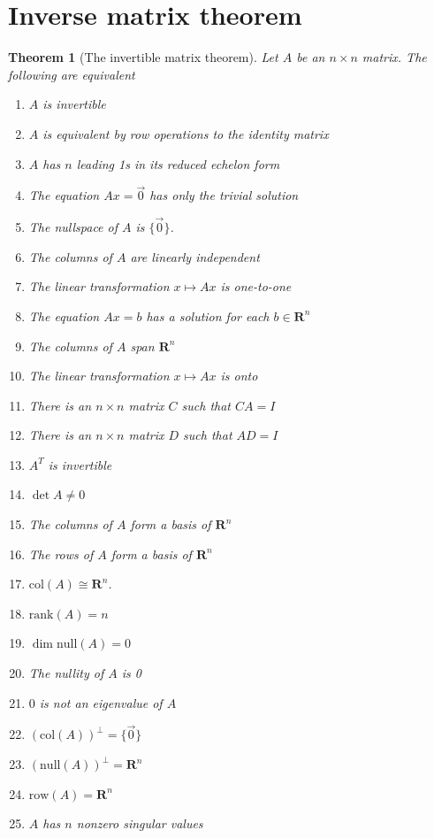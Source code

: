 \documentclass[12pt]{article}
\numberwithin{equation}{subsection}
\numberwithin{figure}{subsection}
\newtheorem{thm}[subsection]{Theorem}
\theoremstyle{note}
\newcommand{\R}{\mathbf{R}}
\newcommand\nul[1]{\mathrm{null}(#1)}
\newcommand\col[1]{\mathrm{col}(#1)}
\newcommand\row[1]{\mathrm{row}(#1)}
\newcommand\rank[1]{\mathrm{rank}(#1)}
\begin{document}
\newpage

 
\appendix



\section{Inverse matrix theorem} \label{ap-inv-mat-thm}

\begin{thm}[The invertible matrix theorem]
	Let $A$ be an $n\times n$ matrix. The following are equivalent
	\begin{enumerate}
		\item $A$ is invertible
		\item $A$ is equivalent by row operations to the identity matrix
		\item $A$ has $n$ leading 1s in its reduced echelon form
		\item The equation $Ax=\vec{0}$ has only the trivial solution
		\item The nullspace of $A$ is $\{\vec{0}\}$. 
		\item The columns of $A$ are linearly independent
		\item The linear transformation $x\mapsto Ax$ is one-to-one
		\item The equation $Ax=b$ has a solution for each $b\in\mathbf{R}^n$
		\item The columns of $A$ span $\mathbf{R}^n$
		\item The linear transformation $x\mapsto Ax$ is onto
		\item There is an $n\times n$ matrix $C$ such that $CA=I$
		\item There is an $n\times n$ matrix $D$ such that $AD=I$
		\item $A^T$ is invertible
		\item $\det{A}\neq 0$
		\item The columns of $A$ form a basis of $\mathbf{R}^n$
		\item The rows of $A$ form a basis of $\mathbf{R}^n$
		\item $\col{A}\cong \mathbf{R}^n$.
		\item $\rank{A}=n$
		\item $\dim \nul{A}=0$
		\item The nullity of $A$ is 0
		\item $0$ is not an eigenvalue of $A$
		\item $(\col{A})^{\perp}=\{\vec{0}\}$
		\item $(\nul{A})^{\perp}=\R^n$
		\item $\row{A}=\R^n$
		\item $A$ has $n$ nonzero singular values
	\end{enumerate}
\end{thm}
\end{document}
